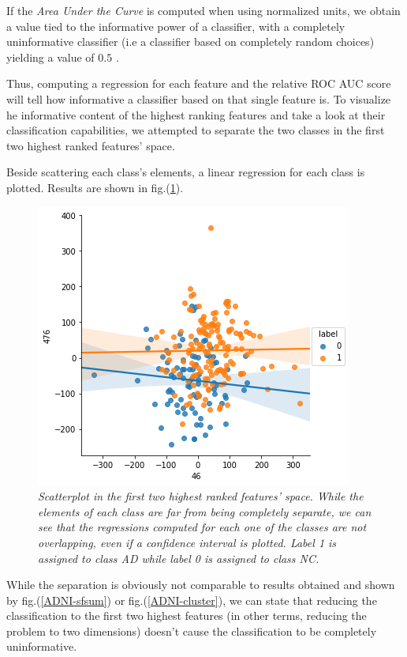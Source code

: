 \documentclass[12pt,openright,twoside,a4paper]{book}
\begin{document}
If the \textit{Area Under the Curve} is computed when using normalized units, we obtain a value tied to the informative power of a classifier, with a completely uninformative classifier (i.e a classifier based on completely random choices) yielding a value of $0.5$ \cite{ROC}.

Thus, computing a regression for each feature and the relative ROC AUC score will tell how informative a classifier based on that single feature is. 
To visualize he informative content of the highest ranking features and take a look at their classification capabilities, we attempted to separate the two classes in the first two highest ranked features' space.

Beside scattering each class's elements, a linear regression for each class is plotted.
Results are shown in fig.(\ref{ADNI-fsep}).

\begin{figure}[!h]
\centering
\includegraphics[scale=0.7]{first-feat-sep}
\caption{\textit{Scatterplot in the first two highest ranked features' space. While  the elements of each class are far from being completely separate, we can see that the regressions computed for each one of the classes are not overlapping, even if a confidence interval is plotted. Label 1 is assigned to class AD while label 0 is assigned to class NC. }}
\label{ADNI-fsep}
\end{figure}

While the separation is obviously not comparable to results obtained and shown by fig.(\ref{ADNI-sfsum}) or fig.(\ref{ADNI-cluster}), we can state that reducing the classification to the first two highest features (in other terms, reducing the problem to two dimensions) doesn't cause the classification to be completely uninformative.
\end{document}
